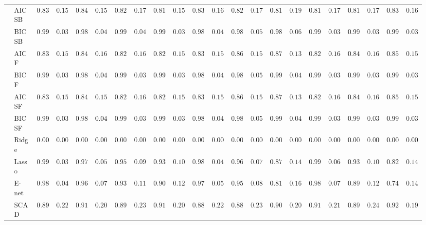 \begin{tabular}{ll|ll|llllll|llllll|llllll}
 & AIC SB  & $0.8317$ & $0.1526$ & $0.8450$ & $0.1576$ & $0.8217$ & $0.1729$ & $0.8183$ & $0.1573$ & $0.8317$ & $0.1633$ & $0.8250$ & $0.1747$ & $0.8183$ & $0.1926$ & $0.8183$ & $0.1710$ & $0.8183$ & $0.1726$ & $0.8317$ & $0.1633$ \\
 & BIC SB  & $0.9917$ & $0.0365$ & $0.9883$ & $0.0489$ & $0.9900$ & $0.0463$ & $0.9950$ & $0.0371$ & $0.9883$ & $0.0427$ & $0.9850$ & $0.0535$ & $0.9850$ & $0.0631$ & $0.9933$ & $0.0328$ & $0.9917$ & $0.0365$ & $0.9917$ & $0.0365$ \\
 & AIC F  & $0.8317$ & $0.1526$ & $0.8467$ & $0.1601$ & $0.8250$ & $0.1698$ & $0.8217$ & $0.1540$ & $0.8383$ & $0.1525$ & $0.8600$ & $0.1530$ & $0.8717$ & $0.1399$ & $0.8250$ & $0.1613$ & $0.8400$ & $0.1640$ & $0.8517$ & $0.1551$ \\
 & BIC F  & $0.9917$ & $0.0365$ & $0.9883$ & $0.0489$ & $0.9933$ & $0.0328$ & $0.9950$ & $0.0371$ & $0.9883$ & $0.0427$ & $0.9850$ & $0.0535$ & $0.9917$ & $0.0435$ & $0.9933$ & $0.0328$ & $0.9917$ & $0.0365$ & $0.9917$ & $0.0365$ \\
 & AIC SF  & $0.8317$ & $0.1526$ & $0.8483$ & $0.1573$ & $0.8250$ & $0.1698$ & $0.8217$ & $0.1540$ & $0.8383$ & $0.1525$ & $0.8600$ & $0.1530$ & $0.8717$ & $0.1399$ & $0.8250$ & $0.1613$ & $0.8400$ & $0.1640$ & $0.8517$ & $0.1551$ \\
 & BIC SF  & $0.9917$ & $0.0365$ & $0.9883$ & $0.0489$ & $0.9933$ & $0.0328$ & $0.9950$ & $0.0371$ & $0.9883$ & $0.0427$ & $0.9850$ & $0.0535$ & $0.9917$ & $0.0435$ & $0.9933$ & $0.0328$ & $0.9917$ & $0.0365$ & $0.9917$ & $0.0365$ \\
 & Ridge  & $0.0000$ & $0.0000$ & $0.0000$ & $0.0000$ & $0.0000$ & $0.0000$ & $0.0000$ & $0.0000$ & $0.0000$ & $0.0000$ & $0.0000$ & $0.0000$ & $0.0000$ & $0.0000$ & $0.0000$ & $0.0000$ & $0.0000$ & $0.0000$ & $0.0000$ & $0.0000$ \\
 & Lasso  & $0.9933$ & $0.0328$ & $0.9767$ & $0.0581$ & $0.9567$ & $0.0966$ & $0.9317$ & $0.1062$ & $0.9883$ & $0.0427$ & $0.9683$ & $0.0738$ & $0.8733$ & $0.1404$ & $0.9900$ & $0.0619$ & $0.9333$ & $0.1059$ & $0.8267$ & $0.1400$ \\
 & E-net  & $0.9850$ & $0.0479$ & $0.9650$ & $0.0796$ & $0.9367$ & $0.1155$ & $0.9050$ & $0.1237$ & $0.9750$ & $0.0598$ & $0.9550$ & $0.0849$ & $0.8167$ & $0.1633$ & $0.9800$ & $0.0760$ & $0.8933$ & $0.1287$ & $0.7467$ & $0.1411$ \\
 & SCAD  & $0.8900$ & $0.2275$ & $0.9100$ & $0.2057$ & $0.8933$ & $0.2375$ & $0.9100$ & $0.2030$ & $0.8833$ & $0.2278$ & $0.8833$ & $0.2363$ & $0.9067$ & $0.2083$ & $0.9150$ & $0.2165$ & $0.8950$ & $0.2458$ & $0.9267$ & $0.1915$ \\

\end{tabular}
